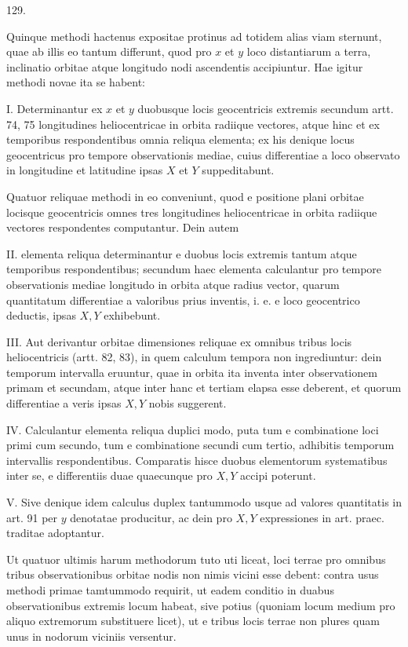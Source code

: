 \par{}\medskip
\begin{center}\hypertarget{native-176-article129}{}129.\end{center}
Quinque methodi hactenus expositae protinus ad totidem alias viam sternunt,
quae ab illis eo tantum differunt, quod pro $x$ et $y$ loco distantiarum a
terra, inclinatio orbitae atque longitudo nodi ascendentis accipiuntur. Hae
igitur methodi novae ita se habent:

I. Determinantur ex $x$ et $y$ duobusque locis geocentricis extremis secundum
artt. 74, 75 longitudines heliocentricae in orbita radiique vectores, atque
hinc et ex temporibus respondentibus omnia reliqua elementa; ex his denique
locus geocentricus pro tempore observationis mediae, cuius differentiae a loco
observato in longitudine et latitudine ipsas $X$ et $Y$ suppeditabunt.

Quatuor reliquae methodi in eo conveniunt, quod e positione plani orbitae
locisque geocentricis omnes tres longitudines heliocentricae in orbita radiique
vectores respondentes computantur. Dein autem

II. elementa reliqua determinantur e duobus locis extremis tantum atque
temporibus respondentibus; secundum haec elementa calculantur pro tempore
observationis mediae longitudo in orbita atque radius vector, quarum quantitatum
differentiae a valoribus prius inventis, i. e. e loco geocentrico deductis,
ipsas $X,Y$ exhibebunt.

III. Aut derivantur orbitae dimensiones reliquae ex omnibus tribus locis
heliocentricis (artt. 82, 83), in quem calculum tempora non ingrediuntur: dein
temporum intervalla eruuntur, quae in orbita ita inventa inter observationem
primam et secundam, atque inter hanc et tertiam elapsa esse deberent, et
quorum differentiae a veris ipsas $X,Y$ nobis suggerent.

IV. Calculantur elementa reliqua duplici modo, puta tum e combinatione
loci primi cum secundo, tum e combinatione secundi cum tertio, adhibitis
temporum intervallis respondentibus. Comparatis hisce duobus elementorum
systematibus inter se, e differentiis duae quaecunque pro $X,Y$ accipi poterunt.

V. Sive denique idem calculus duplex tantummodo usque ad valores quantitatis
in art. 91 per $y$ denotatae producitur, ac dein pro $X,Y$ expressiones
in art. praec. traditae adoptantur.

Ut quatuor ultimis harum methodorum tuto uti liceat, loci terrae pro
omnibus tribus observationibus orbitae nodis non nimis vicini esse debent:
contra usus methodi primae tamtummodo requirit, ut eadem conditio in duabus
observationibus extremis locum habeat, sive potius (quoniam locum medium
pro aliquo extremorum substituere licet), ut e tribus locis terrae non
plures quam unus in nodorum viciniis versentur.
